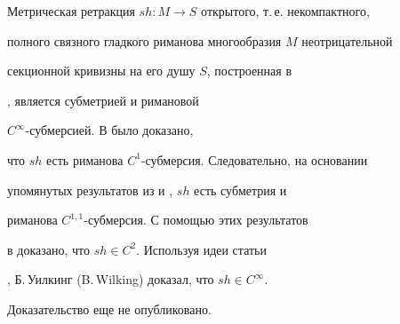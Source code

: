 \begin{exams}


\label{ex10}


Метрическая ретракция $sh: M \rightarrow S$ открытого, т.\,е. некомпактного,


полного связного гладкого риманова многообразия $M$ неотрицательной


секционной кривизны на его душу $S$, построенная в


\cite{SH}, является субметрией и римановой


$C^{\infty}$-субмерсией. В \cite{Pe} было доказано,


что $sh$ есть риманова $C^{1}$-субмерсия. Следовательно, на основании


упомянутых результатов из \cite{BG} и \cite{BN}, $sh$ есть субметрия и


риманова $C^{1,1}$-субмерсия. С помощью этих результатов 


в \cite{G} доказано, что $sh \in C^{2}$. Используя идеи статьи


\cite{Pe}, Б.\,Уилкинг (B.\,Wilking) доказал, что $sh \in C^{\infty}$.


Доказательство еще не опубликовано.


\end{exams}





